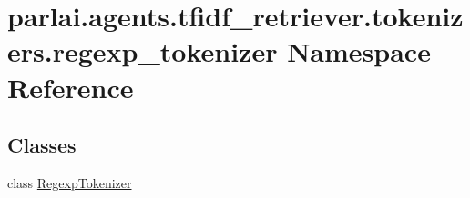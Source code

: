 \hypertarget{namespaceparlai_1_1agents_1_1tfidf__retriever_1_1tokenizers_1_1regexp__tokenizer}{}\section{parlai.\+agents.\+tfidf\+\_\+retriever.\+tokenizers.\+regexp\+\_\+tokenizer Namespace Reference}
\label{namespaceparlai_1_1agents_1_1tfidf__retriever_1_1tokenizers_1_1regexp__tokenizer}
\subsection*{Classes}
\begin{DoxyCompactItemize}
\item 
class \hyperlink{classparlai_1_1agents_1_1tfidf__retriever_1_1tokenizers_1_1regexp__tokenizer_1_1RegexpTokenizer}{Regexp\+Tokenizer}
\end{DoxyCompactItemize}
